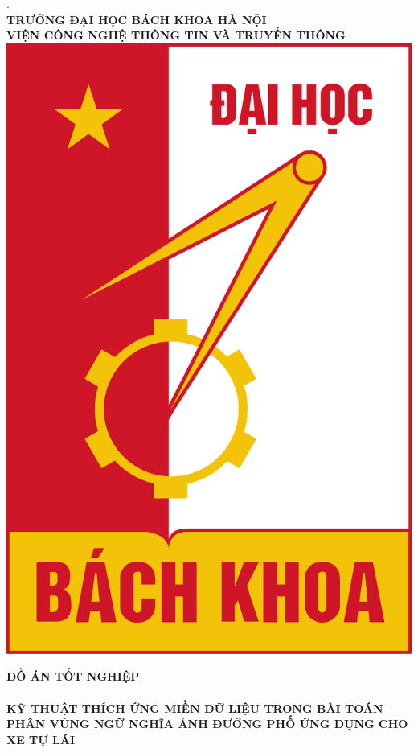 \documentclass[a4paper, 13pt, oneside]{report}
\begin{document}
\begin{titlepage}
\thispagestyle{empty}
\begin{center}

{
. \\
{\fontsize{15}{20}\selectfont \textbf{TRƯỜNG ĐẠI HỌC BÁCH KHOA HÀ NỘI}}\\
{\fontsize{13}{18}\selectfont \textbf{VIỆN CÔNG NGHỆ THÔNG TIN VÀ TRUYỀN THÔNG}\\[1cm]}
	\includegraphics[scale=0.3]{images/hust.jpeg} \\[1.2cm]
\centering

{\fontsize{22}{20}\selectfont \textbf{ĐỒ ÁN TỐT NGHIỆP}}\\\\[0.3cm]
{\fontsize{15}{16}\selectfont \textbf{KỸ THUẬT THÍCH ỨNG MIỀN DỮ LIỆU TRONG BÀI TOÁN PHÂN VÙNG NGỮ NGHĨA ẢNH ĐƯỜNG PHỐ ỨNG DỤNG CHO XE TỰ LÁI}}\\[1cm]

}
\end{center}
\end{titlepage}
\end{document}
